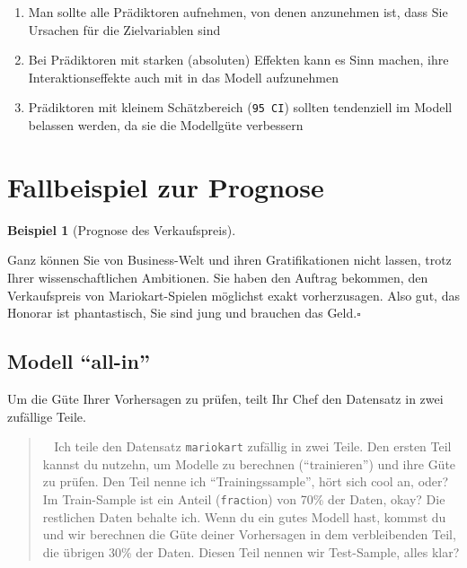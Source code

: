 \documentclass[
  letterpaper,
]{scrbook}
\providecommand{\tightlist}{%
  \setlength{\itemsep}{0pt}\setlength{\parskip}{0pt}}\usepackage{longtable,booktabs,array}
\theoremstyle{definition}
\newtheorem{example}{Beispiel}[chapter]
\theoremstyle{definition}
\theoremstyle{definition}
\theoremstyle{remark}
\begin{document}
\begin{enumerate}
\def\labelenumi{\arabic{enumi}.}
\tightlist
\item
  Man sollte alle Prädiktoren aufnehmen, von denen anzunehmen ist, dass
  Sie Ursachen für die Zielvariablen sind
\item
  Bei Prädiktoren mit starken (absoluten) Effekten kann es Sinn machen,
  ihre Interaktionseffekte auch mit in das Modell aufzunehmen
\item
  Prädiktoren mit kleinem Schätzbereich (\texttt{95\ CI}) sollten
  tendenziell im Modell belassen werden, da sie die Modellgüte
  verbessern
\end{enumerate}

\section{Fallbeispiel zur Prognose}\label{fallbeispiel-zur-prognose}

\begin{example}[Prognose des
Verkaufspreis]\protect\hypertarget{exm-prognose}{}\label{exm-prognose}

Ganz können Sie von Business-Welt und ihren Gratifikationen nicht
lassen, trotz Ihrer wissenschaftlichen Ambitionen. Sie haben den Auftrag
bekommen, den Verkaufspreis von Mariokart-Spielen möglichst exakt
vorherzusagen. Also gut, das Honorar ist phantastisch, Sie sind jung und
brauchen das Geld.\(\square\)

\end{example}

\subsection{Modell ``all-in''}\label{modell-all-in}

Um die Güte Ihrer Vorhersagen zu prüfen, teilt Ihr Chef den Datensatz in
zwei zufällige Teile.

\begin{quote}
🧔‍♂️ Ich teile den Datensatz \texttt{mariokart} zufällig in zwei Teile.
Den ersten Teil kannst du nutzehn, um Modelle zu berechnen
(``trainieren'') und ihre Güte zu prüfen. Den Teil nenne ich
``Trainingssample'', hört sich cool an, oder? Im Train-Sample ist ein
Anteil (\texttt{frac}tion) von 70\% der Daten, okay? Die restlichen
Daten behalte ich. Wenn du ein gutes Modell hast, kommst du und wir
berechnen die Güte deiner Vorhersagen in dem verbleibenden Teil, die
übrigen 30\% der Daten. Diesen Teil nennen wir Test-Sample, alles klar?
\end{quote}
\end{document}
